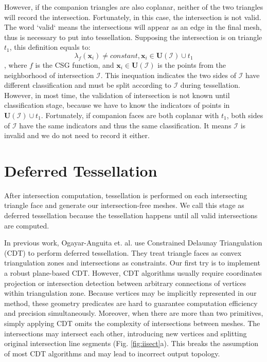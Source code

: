 \documentclass[10pt,journal,compsoc]{IEEEtran}
\begin{document}
However, if the companion triangles are also coplanar, neither of the two triangles will record the intersection. Fortunately, in this case, the intersection is not valid. The word `valid` means the intersections will appear as an edge in the final mesh, thus is necessary to put into tessellation. Supposing the intersection is on triangle $t_1$, this definition equals to:
\begin{equation}
\lambda_f(\bm{x}_i) \neq constant, \bm{x}_i \in \bm{U}(\mathcal{I}) \cup t_1
\end{equation}
, where $f$ is the CSG function, and $\bm{x}_i \in \bm{U}(\mathcal{I})$ is the points from the neighborhood of  intersection $\mathcal{I}$. This inequation indicates the two sides of $\mathcal{I}$ have different classification and must be split according to $\mathcal{I}$ during tessellation. However, in most time, the validation of intersection is not known until classification stage, because we have to know the indicators of points in $\bm{U}(\mathcal{I}) \cup t_1$. Fortunately, if companion faces are both coplanar with $t_1$, both sides of $\mathcal{I}$ have the same indicators and thus the same classification. It means $\mathcal{I}$ is invalid and we do not need to record it either.

\section{Deferred Tessellation}



\label{sec:tessellation}
After intersection computation, tessellation is performed on each intersecting triangle face and generate our intersection-free meshes. We call this stage as deferred tessellation because the tessellation happens until all valid intersections are computed.

In previous work, Ogayar-Anguita et. al. \cite{ogayar2015deferred} use Constrained Delaunay Triangulation (CDT) to perform deferred tessellation. They treat triangle faces as convex triangulation zones and intersections as constraints. Our first try is to implement a robust plane-based CDT. However, CDT algorithms \cite{chew1989constrained,preparata2012computational} usually require coordinates projection or intersection detection between arbitrary connections of vertices within triangulation zone. Because vertices may be implicitly represented in our method, these geometry predicates are hard to guarantee computation efficiency and precision simultaneously. Moreover, when there are more than two primitives, simply applying CDT omits the complexity of intersections between meshes. The intersections may intersect each other, introducing new vertices and splitting original intersection line segments (Fig. \ref{fig:iisect}a). This breaks the assumption of most CDT algorithms and may lead to incorrect output topology.
\end{document}
